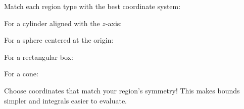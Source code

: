 \documentclass{ximera}
\begin{document}
\begin{problem}
Match each region type with the best coordinate system:

For a cylinder aligned with the $z$-axis:
\begin{multipleChoice}
\end{multipleChoice}

For a sphere centered at the origin:
\begin{multipleChoice}
\end{multipleChoice}

For a rectangular box:
\begin{multipleChoice}
\end{multipleChoice}

For a cone:
\begin{multipleChoice}
\end{multipleChoice}

\begin{feedback}
Choose coordinates that match your region's symmetry! This makes bounds simpler and integrals easier to evaluate.
\end{feedback}
\end{problem}
\end{document}
